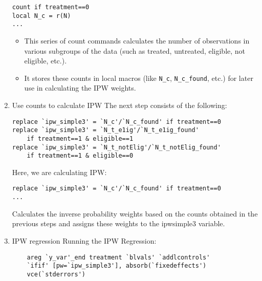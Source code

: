 \documentclass{article}
\begin{document}
\begin{enumerate}
\begin{mdframed}
\begin{verbatim}
count if treatment==0 
local N_c = r(N)
...
\end{verbatim}
\end{mdframed}

\begin{itemize}
    \item This series of count commands calculates the number of observations in various subgroups of the data (such as treated, untreated, eligible, not eligible, etc.).
    \item It stores these counts in local macros (like \texttt{N\_c}, \texttt{N\_c\_found}, etc.) for later use in calculating the IPW weights.
\end{itemize}


\item Use counts to calculate IPW \newline
The next step consists of the following: 

\begin{mdframed}
\begin{verbatim}
replace `ipw_simple3' = `N_c'/`N_c_found' if treatment==0 
replace `ipw_simple3' = `N_t_e1ig'/`N_t_e1ig_found' 
    if treatment==1 & eligible==1
replace `ipw_simple3' = `N_t_notElig'/`N_t_notElig_found' 
    if treatment==1 & eligible==0
\end{verbatim}
\end{mdframed}


\vspace{0.2cm}Here, we are calculating IPW:

\begin{mdframed}
\begin{verbatim}
replace `ipw_simple3' = `N_c'/`N_c_found' if treatment==0 
...
\end{verbatim}
\end{mdframed}

Calculates the inverse probability weights based on the counts obtained in the previous steps and assigns these weights to the ipwsimple3 variable.

\item IPW regression \newline
    Running the IPW Regression:
    \begin{mdframed}
    \begin{verbatim}
    areg `y_var'_end treatment `blvals' `addlcontrols' 
    `ifif' [pw=`ipw_simple3'], absorb(`fixedeffects') 
    vce(`stderrors')
    \end{verbatim}
    \end{mdframed}
\end{enumerate}
\end{document}
